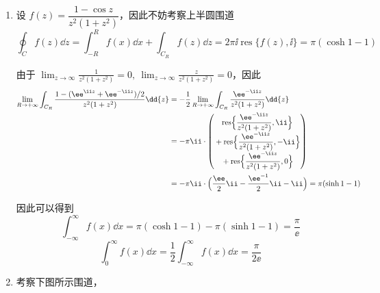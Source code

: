 \begin{question}
\begin{solution}
\begin{enumerate}
综上可以得到
\[
\operatorname{v.p.}\int_{-\infty}^{\infty}f(x)\dd{x}=-\frac{\pi}{2}\frac{\sin a}{a}
\]
\[
\int_{-\infty}^{\infty}\frac{\cos(x+a)\sin(x-a)}{x^2-a^2}\dd{x}=\Im\Bigl\{\int_{-\infty}^{\infty}f(x)\dd{x}\Bigr\}=0
\]

  \item 设 \(f(z)=\dfrac{1-\cos z}{z^2(1+z^2)}\)，因此不妨考察上半圆围道
\[
\oint_C f(z)\dd{z}=\int_{-R}^{R}f(x)\dd{x}+\int_{C_R}f(z)\dd{z}=2\pi\ii\operatorname{res}\{f(z),\ii\}=\pi(\cosh1-1)
\]

由于 \(\displaystyle\lim_{z\to\infty}\frac{1}{z^2(1+z^2)}=0,\ \lim_{z\to\infty}\frac{z}{z^2(1+z^2)}=0\)，因此
\[
\begin{aligned}
\lim_{R\to+\infty}\int_{C_R}\frac{1-(\ee^{\ii z}+\ee^{-\ii z})/2}{z^2(1+z^2)}\dd{z}
&=-\frac12\lim_{R\to+\infty}\int_{C_R}\frac{\ee^{-\ii z}}{z^2(1+z^2)}\dd{z}\\
&=-\pi\ii\cdot\begin{pmatrix}
\operatorname{res}\Bigl\{\dfrac{\ee^{-\ii z}}{z^2(1+z^2)},\ii\Bigr\}\\{}+\operatorname{res}\Bigl\{\dfrac{\ee^{-\ii z}}{z^2(1+z^2)},-\ii\Bigr\}\\{}+\operatorname{res}\Bigl\{\dfrac{\ee^{-\ii z}}{z^2(1+z^2)},0\Bigr\}
\end{pmatrix}\\
&=-\pi\ii\cdot\Bigl(\frac{\ee}{2}\ii-\frac{\ee^{-1}}{2}\ii-\ii\Bigr)=\pi(\sinh1-1)
\end{aligned}
\]

因此可以得到
\[
\int_{-\infty}^{\infty}f(x)\dd{x}=\pi(\cosh1-1)-\pi(\sinh1-1)=\frac{\pi}{\ee}
\]
\[
\int_{0}^{\infty}f(x)\dd{x}=\frac12\int_{-\infty}^{\infty}f(x)\dd{x}=\frac{\pi}{2\ee}
\]

  \item 考察下图所示围道，

\begin{center}
\end{center}


\end{enumerate}
\end{solution}
\end{question}
